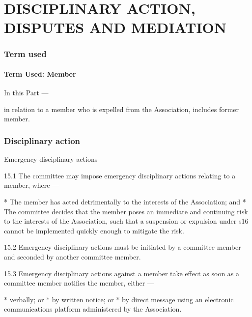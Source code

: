 \documentclass[../constitution.tex]{subfiles}
\begin{document}
\part{DISCIPLINARY ACTION, DISPUTES AND MEDIATION} \label{part-4-disciplinary-action-disputes-and-mediation}


\section{Term used} \label{division-1-term-used}

\hypertarget{term-used-member}{%
\subsection{Term Used: Member}\label{term-used-member}}

In this Part  ---

 in relation to a member who is expelled from the Association, includes former member.

\hypertarget{division-2-disciplinary-action}{%
\section{Disciplinary action}\label{division-2-disciplinary-action}}


Emergency disciplinary actions

15.1 The committee may impose emergency disciplinary actions relating to a member, where ---

* The member has acted detrimentally to the interests of the Association; and
* The committee decides that the member poses an immediate and continuing risk to the interests of the Association, such that a suspension or expulsion under s16 cannot be implemented quickly enough to mitigate the risk.

15.2 Emergency disciplinary actions must be initiated by a committee member and seconded by another committee member.

15.3 Emergency disciplinary actions against a member take effect as soon as a committee member notifies the member, either ---

* verbally; or
* by written notice; or
* by direct message using an electronic communications platform administered by the Association.
\end{document}
